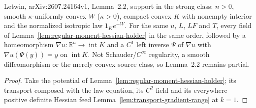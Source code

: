 \begin{lemma}
  \label{lem:regular-moment-gradient-inverse}
  \leanok
  Letwin, arXiv:2607.24164v1, Lemma~2.2, support in the strong class: $n>0$, smooth $\kappa$-uniformly convex $W$ ($\kappa>0$),
  compact convex $K$ with nonempty interior and the normalized isotropic law $1_Ke^{-W}$. For the same $u$, $L$, $LF$ and $T$,
  every field of Lemma~\ref{lem:regular-moment-hessian-holder} in the same order, followed by a homeomorphism
  $\nabla u:\mathbb R^n\to\operatorname{int}K$ and a $C^1$ left inverse $\Psi$ of $\nabla u$ with $\nabla u(\Psi(y))=y$ on
  $\operatorname{int}K$. Not Schauder/$C^\infty$ regularity, a smooth diffeomorphism or the merely convex source class, so
  Lemma~2.2 remains partial.
\end{lemma}
\begin{proof}
  \leanok
  Take the potential of Lemma~\ref{lem:regular-moment-hessian-holder}; its transport composed with the law equation,
  its $C^2$ field and its everywhere positive definite Hessian feed Lemma~\ref{lem:transport-gradient-range} at $k=1$.
\end{proof}

